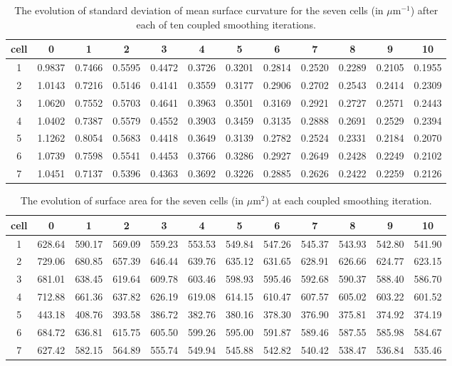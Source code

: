 \documentclass[a4paper,10pt]{article}
\begin{document}
\begin{table}[H]
\begin{center}
\footnotesize
\begin{tabular}{|c|ccccccccccc|}
\hline
cell & 0 &1 &2 &3 &4 &5 &6 &7 &8 &9 &10\\
\hline

1 &0.9837 &0.7466 &0.5595 &0.4472 &0.3726 &0.3201 &0.2814 &0.2520 &0.2289 &0.2105 &0.1955\\
2 &1.0143 &0.7216 &0.5146 &0.4141 &0.3559 &0.3177 &0.2906 &0.2702 &0.2543 &0.2414 &0.2309\\
3 &1.0620 &0.7552 &0.5703 &0.4641 &0.3963 &0.3501 &0.3169 &0.2921 &0.2727 &0.2571 &0.2443\\
4 &1.0402 &0.7387 &0.5579 &0.4552 &0.3903 &0.3459 &0.3135 &0.2888 &0.2691 &0.2529 &0.2394\\
5 &1.1262 &0.8054 &0.5683 &0.4418 &0.3649 &0.3139 &0.2782 &0.2524 &0.2331 &0.2184 &0.2070\\
6 &1.0739 &0.7598 &0.5541 &0.4453 &0.3766 &0.3286 &0.2927 &0.2649 &0.2428 &0.2249 &0.2102\\
7 &1.0451 &0.7137 &0.5396 &0.4363 &0.3692 &0.3226 &0.2885 &0.2626 &0.2422 &0.2259 &0.2126\\
\hline
\end{tabular}
\end{center}
\caption{The evolution of standard deviation of mean surface curvature for the seven cells (in $\mu \text{m}^{-1}$)  after each of ten coupled smoothing iterations.}
\label{tab:curv}
\end{table}

\begin{table}[H]
\begin{center}
\footnotesize
\begin{tabular}{|c|ccccccccccc|}
\hline
cell & 0 &1 &2 &3 &4 &5 &6 &7 &8 &9 &10\\
\hline
1 &628.64 &590.17 &569.09 &559.23 &553.53 &549.84 &547.26 &545.37 &543.93 &542.80 &541.90\\
2 &729.06 &680.85 &657.39 &646.44 &639.76 &635.12 &631.65 &628.91 &626.66 &624.77 &623.15\\
3 &681.01 &638.45 &619.64 &609.78 &603.46 &598.93 &595.46 &592.68 &590.37 &588.40 &586.70\\
4 &712.88 &661.36 &637.82 &626.19 &619.08 &614.15 &610.47 &607.57 &605.02 &603.22 &601.52\\
5 &443.18 &408.76 &393.58 &386.72 &382.76 &380.16 &378.30 &376.90 &375.81 &374.92 &374.19\\
6 &684.72 &636.81 &615.75 &605.50 &599.26 &595.00 &591.87 &589.46 &587.55 &585.98 &584.67\\
7 &627.42 &582.15 &564.89 &555.74 &549.94 &545.88 &542.82 &540.42 &538.47 &536.84 &535.46\\
\hline
\end{tabular}
\end{center}
\caption{The evolution of surface area for the seven cells (in $\mu \text{m}^2$)  at each coupled smoothing iteration.}
\label{tab:surf}
\end{table}
\end{document}

